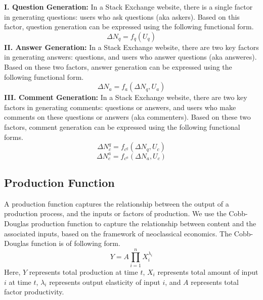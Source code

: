 \indent \textbf{I. Question Generation:} In a Stack Exchange website, there is a single factor in generating questions: users who ask questions (aka askers). Based on this factor, question generation can be expressed using the following functional form.
\begin{equation*}
\Delta N_q = f_q(U_q)
\end{equation*}
\indent \textbf{II. Answer Generation:} In a Stack Exchange website, there are two key factors in generating answers: questions, and users who answer questions (aka answeres). Based on these two factors, answer generation can be expressed using the following functional form.
\begin{equation*}
\Delta N_a = f_a(\Delta N_q, U_a)
\end{equation*}
\textbf{III. Comment Generation:} In a Stack Exchange website, there are two key factors in generating comments: questions or answers, and users who make comments on these questions or answers (aka commenters). Based on these two factors, comment generation can be expressed using the following functional forms.
\begin{equation*}
\Delta N_c^q = f_{c^q}(\Delta N_q, U_c)
\end{equation*}
\begin{equation*}
\Delta N_c^a = f_{c^a}(\Delta N_a, U_c)
\end{equation*}

\subsection{Production Function}
A production function captures the relationship between the output of a production process, and the inputs or factors of production. We use the Cobb-Douglas production function to capture the relationship between content and the associated inputs, based on the framework of neoclassical economics. The Cobb-Douglas function is of following form.
\begin{equation*}
Y = A\prod_{i=1}^{n} X_i^{\lambda_i}
\end{equation*} 
\noindent Here, $Y$ represents total production at time $t$, $X_i$ represents total amount of input $i$ at time $t$, $\lambda_i$ represents output elasticity of input $i$, and $A$ represents total factor productivity. 

